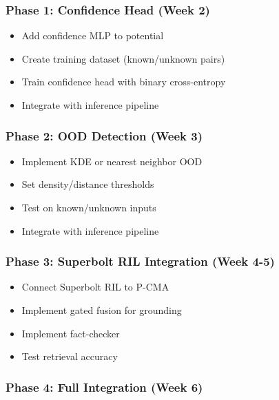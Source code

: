 \documentclass[
  11pt,
  a4paper,
]{article}
\providecommand{\tightlist}{%
  \setlength{\itemsep}{0pt}\setlength{\parskip}{0pt}}
\begin{document}
\subsubsection{Phase 1: Confidence Head (Week
2)}\label{phase-1-confidence-head-week-2}

\begin{itemize}
\tightlist
\item[$\square$]
  Add confidence MLP to potential
\item[$\square$]
  Create training dataset (known/unknown pairs)
\item[$\square$]
  Train confidence head with binary cross-entropy
\item[$\square$]
  Integrate with inference pipeline
\end{itemize}

\subsubsection{Phase 2: OOD Detection (Week
3)}\label{phase-2-ood-detection-week-3}

\begin{itemize}
\tightlist
\item[$\square$]
  Implement KDE or nearest neighbor OOD
\item[$\square$]
  Set density/distance thresholds
\item[$\square$]
  Test on known/unknown inputs
\item[$\square$]
  Integrate with inference pipeline
\end{itemize}

\subsubsection{Phase 3: Superbolt RIL Integration (Week
4-5)}\label{phase-3-superbolt-ril-integration-week-4-5}

\begin{itemize}
\tightlist
\item[$\square$]
  Connect Superbolt RIL to P-CMA
\item[$\square$]
  Implement gated fusion for grounding
\item[$\square$]
  Implement fact-checker
\item[$\square$]
  Test retrieval accuracy
\end{itemize}

\subsubsection{Phase 4: Full Integration (Week
6)}\label{phase-4-full-integration-week-6}
\end{document}
